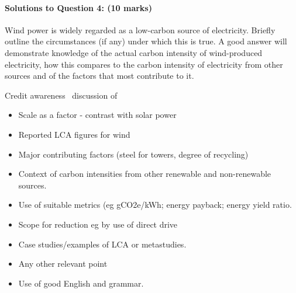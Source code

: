 \documentclass[a4paper,12pt,fleqn]{article}
\begin{document}
\paragraph{\textbf{Solutions to Question 4: (10 marks)}}
Wind power is widely regarded as a low-carbon source of electricity. Briefly outline the circumstances (if any) under which this is true.
A good answer will demonstrate knowledge of the actual carbon intensity of wind-produced electricity, how this compares to the carbon intensity 
of electricity from other sources and of the factors that most contribute to it.\par
Credit awareness \ discussion of 
\begin{itemize}
\item Scale as a factor - contrast with solar power
\item Reported LCA figures for wind
\item Major contributing factors (steel for towers, degree of recycling)
\item Context of carbon intensities from other renewable and non-renewable sources.
\item Use of suitable metrics (eg gCO2e/kWh; energy payback; energy yield ratio.
\item Scope for reduction eg by use of direct drive
\item Case studies/examples of LCA or metastudies.
\item Any other relevant point
\item Use of good English and grammar.
\end{itemize}


\end{document}
